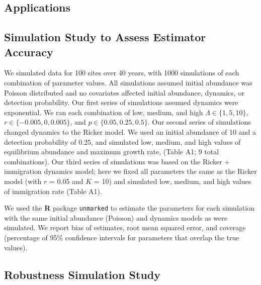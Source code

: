 \documentclass[12pt,english]{article}
\begin{document}
\begin{spacing}{1.9}
\begin{flushleft}
\section*{Applications}
\label{sec:app}

\subsection*{Simulation Study to Assess Estimator Accuracy}


We simulated data for 100 sites over 40 years, with 1000 simulations of 
each combination of parameter values.  All
simulations assumed initial abundance was Poisson distributed
and no covariates affected initial abundance, dynamics, or
detection probability.  Our first series of simulations
assumed dynamics were exponential.  We ran 
each combination of low, medium, and high $\Lambda \in
\{1,5,10\}$, $r \in \{-0.005, 0, 0.005\}$, and
$p \in \{0.05, 0.25, 0.5\}$. 
Our second series of simulations changed dynamics to the Ricker
model. We used an initial abundance of 10 and a detection probability
of 0.25, and simulated low, medium, and high values of equilibrium
abundance and maximum growth rate, (Table A1;
9 total combinations). Our third series of simulations was based
on the Ricker + immigration dynamics model; here we fixed all
parameters the same as the Ricker model (with $r$ = 0.05 and $K$ = 10) and
simulated low, medium, and high values of immigration rate (Table A1).

We used the \textbf{R} package \texttt{unmarked} to estimate the parameters 
for each simulation with the same
initial abundance (Poisson) and dynamics models as were simulated.
We report bias of estimates, root
mean squared error, and coverage (percentage of 95\% confidence
intervals for parameters that overlap the true values).

\subsection*{Robustness Simulation Study}


\end{flushleft}
\end{spacing}
\end{document}

